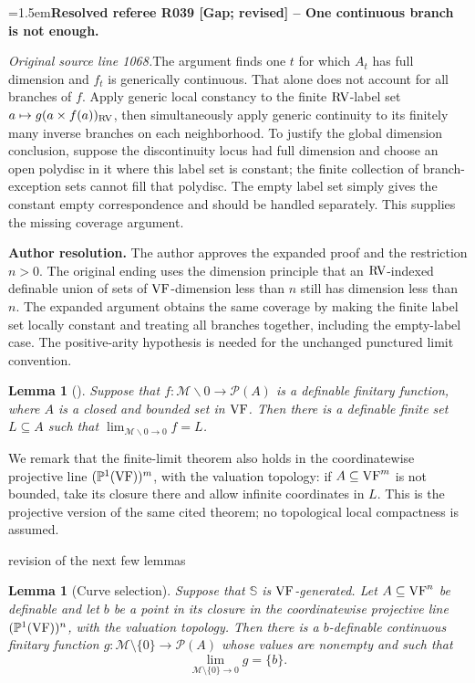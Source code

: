 \documentclass[12pt]{amsart}
\newcommand{\ResolvedRefereeRemark}[5]{%
  \par\medskip\begingroup\normalfont\small\color{gray}%
  \emergencystretch=1.5em\noindent\textbf{Resolved referee R#1 [#2] -- #3.}\par\nobreak\noindent #4\par
  \medskip\color{ResolutionGreen}\noindent\textbf{Author resolution.} #5\par
  \endgroup\medskip
}
\newcommand{\yimu}[1]{{\color{blue}#1}}
\theoremstyle{plain}
\newtheorem{lem}[thm]{Lemma}
\theoremstyle{definition}
\theoremstyle{remark}
\numberwithin{equation}{section}
\theoremstyle{plain}
\newcommand{\VF}{\textup{VF}}
\newcommand{\RV}{\textup{RV}}
\newcommand{\MM}{\mdl M}
\newcommand{\0}{\emptyset}
\newcommand{\mdl}[1]{\mathcal{#1}}  %
\newcommand{\fun}{\longrightarrow}
\newcommand{\sub}{\subseteq}
\newcommand{\mi}{\smallsetminus}
\begin{document}
\ResolvedRefereeRemark{039}{Gap; revised}{One continuous branch is not enough}{%
\textit{Original source line 1068.}\quad The argument finds one $t$ for which $A_t$ has full dimension and $f_t$ is generically continuous. That alone does not account for all branches of $f$. Apply generic local constancy to the finite $\RV$-label set $a\mapsto g(a\times f(a))_{\RV}$, then simultaneously apply generic continuity to its finitely many inverse branches on each neighborhood. To justify the global dimension conclusion, suppose the discontinuity locus had full dimension and choose an open polydisc in it where this label set is constant; the finite collection of branch-exception sets cannot fill that polydisc. The empty label set simply gives the constant empty correspondence and should be handled separately. This supplies the missing coverage argument.
}{The author approves the expanded proof and the restriction $n>0$. The original ending uses the dimension principle that an $\RV$-indexed definable union of sets of $\VF$-dimension less than $n$ still has dimension less than $n$. The expanded argument obtains the same coverage by making the finite label set locally constant and treating all branches together, including the empty-label case. The positive-arity hypothesis is needed for the unchanged punctured limit convention.}

\begin{lem}[{\cite[Lemma~9.5]{Yin:special:trans}}]\label{lim:exists}
Suppose that $f : \MM \mi 0 \fun \mdl P (A)$ is a definable finitary function, where $A$ is a closed and bounded set in $\VF$. Then there is a definable finite set $L \sub A$ such that $\lim_{\MM \mi 0 \rightarrow 0} f = L$.
\end{lem}

We remark that the finite-limit theorem also holds in the coordinatewise projective line $(\mathbb P^1(\VF))^m$, with the valuation topology: if $A\subseteq\VF^m$ is not bounded, take its closure there and allow infinite coordinates in $L$. This is the projective version of the same cited theorem; no topological local compactness is assumed.


\yimu{revision of the next few lemmas}

\begin{lem}[Curve selection]\label{curve:select}
Suppose that $\mathbb S$ is $\VF$-generated. Let $A\sub\VF^n$ be definable and let $b$ be a point in its closure in the coordinatewise projective line $(\mathbb P^1(\VF))^n$, with the valuation topology. Then there is a $b$-definable continuous finitary function $g:\MM\setminus\{0\}\fun\mdl P(A)$ whose values are nonempty and such that
\[
\lim_{\MM\setminus\{0\}\to0}g=\{b\}.
\]
\end{lem}
\end{document}

